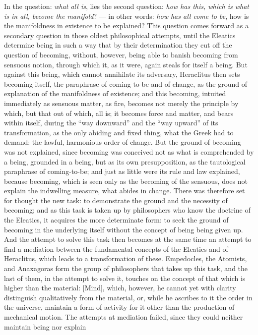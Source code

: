 In the question: \emph{what all is}, lies the second question:
\emph{how has this, which is what is in all, become the manifold}? ---
in other words: \emph{how has all come to be}, how is the manifoldness
in existence to be explained? This question comes forward as a
secondary question in those oldest philosophical attempts,
until the Eleatics determine being in such a way that by their
determination they cut off the question of becoming, without, however,
being able to banish becoming from sensuous notion, through which it,
as it were, again steals for itself a being. But against this being,
which cannot annihilate its adversary, Heraclitus then sets becoming
itself, the paraphrase of coming-to-be and of change, as the ground of
explanation of the manifoldness of existence; and this becoming,
intuited immediately as sensuous matter, as fire, becomes not merely
the principle by which, but that out of which, all is; it becomes force
and matter, and bears within itself, during the ``way downward'' and
the ``way upward'' of its transformation, as the only abiding and fixed
thing, what the Greek had to demand: the lawful, harmonious order of
change. But the ground of becoming was not explained, since becoming
was conceived not as what is comprehended by a being, grounded in a
being, but as its own presupposition, as the tautological paraphrase of
coming-to-be; and just as little were its rule and law explained,
because becoming, which is seen only as the becoming of the sensuous,
does not explain the indwelling measure, what abides in change. There
was therefore set for thought the new task: to demonstrate the ground
and the necessity of becoming; and as this task is taken up by
philosophers who know the doctrine of the Eleatics, it acquires the
more determinate form: to seek the ground of becoming in the underlying
itself without the concept of being being given up. And the attempt to
solve this task then becomes at the same time an attempt to find a
mediation between the fundamental concepts of the Eleatics and of
Heraclitus, which leads to a transformation of these. Empedocles, the
Atomists, and Anaxagoras form the group of philosophers that takes up
this task, and the last of them, in the attempt to solve it, touches on
the concept of that which is higher than the material: 
[Mind], which, however, he cannot yet with clarity distinguish
qualitatively from the material, or, while he ascribes to it the order
in the universe, maintain a form of activity for it other than the
production of mechanical motion. The attempts at mediation
failed, since they could neither maintain being nor explain
